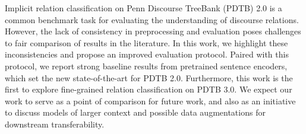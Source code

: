 Implicit relation classification on Penn Discourse TreeBank (PDTB) 2.0 is a common benchmark task for evaluating the understanding of discourse relations. However, the lack of consistency in preprocessing and evaluation poses challenges to fair comparison of results in the literature. In this work, we highlight these inconsistencies and propose an improved evaluation protocol. Paired with this protocol, we report strong baseline results from pretrained sentence encoders, which set the new state-of-the-art for PDTB 2.0. Furthermore, this work is the first to explore fine-grained relation classification on PDTB 3.0. We expect our work to serve as a point of comparison for future work, and also as an initiative to discuss models of larger context and possible data augmentations for downstream transferability.
